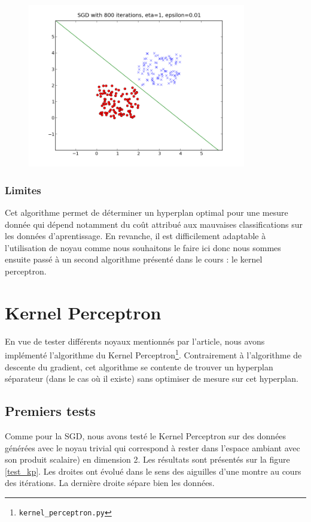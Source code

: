 \documentclass{article}
\begin{document}
\begin{figure}[!h]
\includegraphics[width=0.85\textwidth]{../SGD}
\end{figure}

\subsubsection{Limites}
Cet algorithme permet de déterminer un hyperplan optimal pour une mesure donnée qui dépend notamment du coût attribué aux mauvaises classifications sur les données d'aprentissage. En revanche, il est difficilement adaptable à l'utilisation de noyau comme nous souhaitons le faire ici donc nous sommes ensuite passé à un second algorithme présenté dans le cours : le kernel perceptron.

\section{Kernel Perceptron}
\label{kernelperceptron}
En vue de tester différents noyaux mentionnés par l'article, nous avons implémenté l'algorithme du Kernel Perceptron\footnote{\texttt{kernel\_perceptron.py}}. Contrairement à l'algorithme de descente du gradient, cet algorithme se contente de trouver un hyperplan séparateur (dans le cas où il existe) sans optimiser de mesure sur cet hyperplan.

\subsection{Premiers tests}
Comme pour la SGD, nous avons testé le Kernel Perceptron sur des données générées avec le noyau trivial qui correspond à rester dans l'espace ambiant avec son produit scalaire) en dimension 2. Les résultats sont présentés sur la figure \ref{test_kp}. Les droites ont évolué dans le sens des aiguilles d'une montre au cours des itérations. La dernière droite sépare bien les données.
\end{document}
